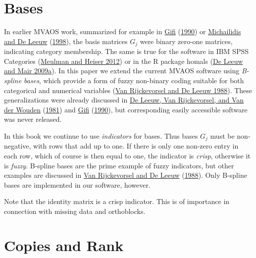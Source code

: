 \documentclass[
  12pt,
]{book}
\begin{document}
\hypertarget{bases}{%
\section{Bases}\label{bases}}

In earlier MVAOS work, summarized for example in \protect\hyperlink{ref-gifi_B_90}{Gifi} (\protect\hyperlink{ref-gifi_B_90}{1990}) or \protect\hyperlink{ref-michailidis_deleeuw_A_98}{Michailidis and De Leeuw} (\protect\hyperlink{ref-michailidis_deleeuw_A_98}{1998}), the basis matrices \(G_j\) were binary zero-one matrices, indicating category membership. The same is true for the software in IBM SPSS Categories (\protect\hyperlink{ref-meulman_heiser_12}{Meulman and Heiser 2012}) or in the R package homals (\protect\hyperlink{ref-deleeuw_mair_A_09a}{De Leeuw and Mair 2009a}). In this paper we extend the current MVAOS software using \emph{B-spline bases}, which provide a form of fuzzy non-binary coding suitable for both categorical and numerical variables (\protect\hyperlink{ref-vanrijckevorsel_deleeuw_B_88}{Van Rijckevorsel and De Leeuw 1988}). These generalizations were already discussed in \protect\hyperlink{ref-deleeuw_vanrijckevorsel_vanderwouden_A_81}{De Leeuw, Van Rijckevorsel, and Van der Wouden} (\protect\hyperlink{ref-deleeuw_vanrijckevorsel_vanderwouden_A_81}{1981}) and \protect\hyperlink{ref-gifi_B_90}{Gifi} (\protect\hyperlink{ref-gifi_B_90}{1990}), but corresponding easily accessible software was never released.

In this book we continue to use \emph{indicators} for bases. Thus bases \(G_j\) must be non-negative, with rows that add up to one. If there is only one non-zero entry in each row, which of course is then equal to one, the indicator is \emph{crisp}, otherwise it is \emph{fuzzy}. B-spline bases are the prime example of fuzzy indicators, but other examples are discussed in \protect\hyperlink{ref-vanrijckevorsel_deleeuw_B_88}{Van Rijckevorsel and De Leeuw} (\protect\hyperlink{ref-vanrijckevorsel_deleeuw_B_88}{1988}). Only B-spline bases are implemented in our software, however.

Note that the identity matrix is a crisp indicator. This is of importance in connection with missing data and orthoblocks.

\hypertarget{copies-and-rank}{%
\section{Copies and Rank}\label{copies-and-rank}}
\end{document}
